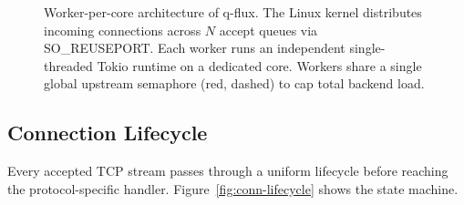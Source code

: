 \documentclass[a4paper, 11pt]{article}
\begin{document}
\begin{figure}[t]
\caption{Worker-per-core architecture of q-flux. The Linux kernel distributes
incoming connections across $N$ accept queues via SO\_REUSEPORT. Each worker
runs an independent single-threaded Tokio runtime on a dedicated core. Workers
share a single global upstream semaphore (red, dashed) to cap total backend load.}
\label{fig:worker-arch}
\end{figure}

\subsection{Connection Lifecycle}
\label{sec:lifecycle}

Every accepted TCP stream passes through a uniform lifecycle before reaching the
protocol-specific handler.  Figure~\ref{fig:conn-lifecycle} shows the state
machine.
\end{document}
